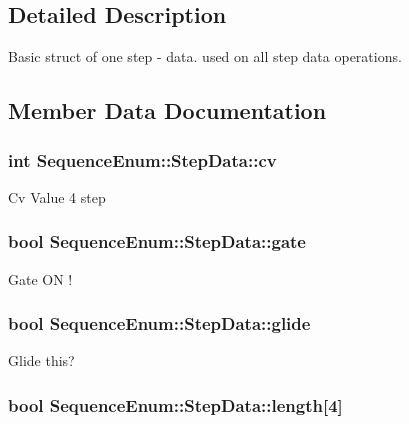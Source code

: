 \subsection{Detailed Description}
Basic struct of one step -\/ data. used on all step data operations. 

\subsection{Member Data Documentation}
\hypertarget{structSequenceEnum_1_1StepData_a94070c904112e9bbc18ac7e63ea1d8d0}{
\subsubsection[{cv}]{\setlength{\rightskip}{0pt plus 5cm}int Sequence\-Enum\-::\-Step\-Data\-::cv}}\label{structSequenceEnum_1_1StepData_a94070c904112e9bbc18ac7e63ea1d8d0}
Cv Value 4 step \hypertarget{structSequenceEnum_1_1StepData_a597603a9b2d9eaf490f659dfcbbee804}{
\subsubsection[{gate}]{\setlength{\rightskip}{0pt plus 5cm}bool Sequence\-Enum\-::\-Step\-Data\-::gate}}\label{structSequenceEnum_1_1StepData_a597603a9b2d9eaf490f659dfcbbee804}
Gate O\-N ! \hypertarget{structSequenceEnum_1_1StepData_a067c43b25989443622354b94ddee2799}{
\subsubsection[{glide}]{\setlength{\rightskip}{0pt plus 5cm}bool Sequence\-Enum\-::\-Step\-Data\-::glide}}\label{structSequenceEnum_1_1StepData_a067c43b25989443622354b94ddee2799}
Glide this? \hypertarget{structSequenceEnum_1_1StepData_a493978b8534c96c86e10b51be7f4bf62}{
\subsubsection[{length}]{\setlength{\rightskip}{0pt plus 5cm}bool Sequence\-Enum\-::\-Step\-Data\-::length\mbox{[}4\mbox{]}}}\label{structSequenceEnum_1_1StepData_a493978b8534c96c86e10b51be7f4bf62}
